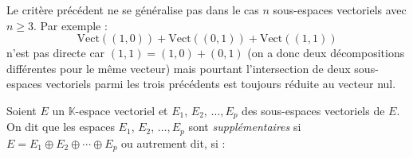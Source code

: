\documentclass[a4paper,10pt]{report}
\begin{document}
\begin{rem} Le critère précédent ne se généralise pas dans le cas $n$ sous-espaces vectoriels avec $n \geq 3$. Par exemple :
$$ \textrm{Vect}((1,0)) + \textrm{Vect}((0,1)) + \textrm{Vect}((1,1)) $$
n'est pas directe car $(1,1)= (1,0) + (0,1)$ (on a donc deux décompositions différentes pour le même vecteur) mais pourtant l'intersection de deux sous-espaces vectoriels parmi les trois précédents est toujours réduite au vecteur nul.
\end{rem}


\begin{defin}
Soient $E$ un $\mathbb{K}$-espace vectoriel et $E_1$, $E_2$, $\ldots, E_p$ des sous-espaces vectoriels de $E$.  On dit que les espaces $E_1$, $E_2$, $\ldots, E_p$ sont \textit{supplémentaires} si $E = E_1 \oplus E_2 \oplus \cdots \oplus E_p$ ou autrement dit, si :
\vspace{1cm}
\end{defin}
\medskip
\end{document}
